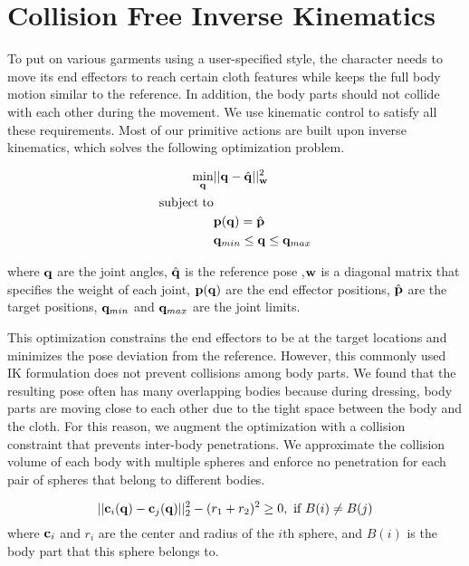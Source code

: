 \section{Collision Free Inverse Kinematics}


To put on various garments using a user-specified style, the character needs to move its end effectors to reach certain cloth features while keeps the full body motion similar to the reference. In addition, the body parts should not collide with each other during the movement. We use kinematic control to satisfy all these requirements. Most of our primitive actions are built upon inverse kinematics, which solves the following optimization problem.

\begin{align}
\label{eq:IK}
  \min_{\mathbf{q}} & ||\mathbf{q} - \hat{\mathbf{q}}||_{\mathbf{w}}^2 \\
  \nonumber  \mathrm{subject\;} \mathrm{to} & \\
  \nonumber  &\mathbf{p}(\mathbf{q}) = \hat{\mathbf{p}}\\
\nonumber   &\mathbf{q}_{min} \leq \mathbf{q} \leq \mathbf{q}_{max}
\end{align}

where $\mathbf{q}$ are the joint angles, $\hat{\mathbf{q}}$ is the reference pose ,$\mathbf{w}$ is a diagonal matrix that specifies the weight of each joint, $\mathbf{p}(\mathbf{q})$ are the end effector positions, $\hat{\mathbf{p}}$ are the target positions, $\mathbf{q}_{min}$ and $\mathbf{q}_{max}$ are the joint limits.

This optimization constrains the end effectors to be at the target locations and minimizes the pose deviation from the reference. However, this commonly used IK formulation does not prevent collisions among body parts. We found that the resulting pose often has many overlapping bodies because during dressing, body parts are moving close to each other due to the tight space between the body and the cloth. For this reason, we augment the optimization with a collision constraint that prevents inter-body penetrations. We approximate the collision volume of each body with multiple spheres and enforce no penetration for each pair of spheres that belong to different bodies.

\begin{equation}
  ||\mathbf{c}_i(\mathbf{q}) - \mathbf{c}_j(\mathbf{q})||_2^2 - (r_1 + r_2)^2 \geq 0,\mbox{ if }B(i) \neq B(j)
  \label{eq:collision}
\end{equation}
where $\mathbf{c}_i$ and $r_i$ are the center and radius of the $i$th sphere, and $B(i)$ is the body part that this sphere belongs to.
 
